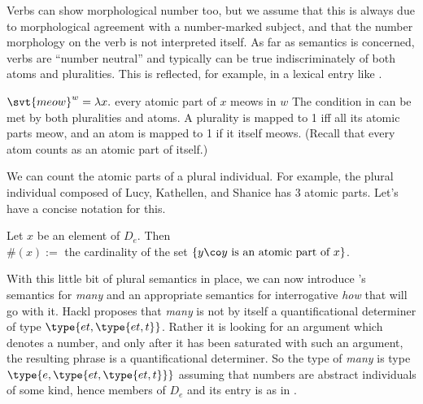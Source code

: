 Verbs can show morphological number too, but we assume that this is always due
to morphological agreement with a number-marked subject, and that the number
morphology on the verb is not interpreted itself. As far as semantics is
concerned, verbs are ``number neutral'' and typically can be true
indiscriminately of both atoms and pluralities. This is reflected, for example,
in a lexical entry like \Next.

\ex $\svt{meow}^{w} = \lambda x.$ every atomic part of $x$ meows in $w$ \xe
%
The condition in \Last can be met by both pluralities and atoms. A plurality is
mapped to 1 iff all its atomic parts meow, and an atom is mapped to 1 if it
itself meows. (Recall that every atom counts as an atomic part of itself.)

We can count the atomic parts of a plural individual. For example, the plural
individual composed of Lucy, Kathellen, and Shanice has 3 atomic parts. Let's
have a concise notation for this.

\ex Let $x$ be an element of $D_{e}$. Then\\
    $\#(x) :=$ the cardinality of the set $\{y\co y\ \text{is an atomic part
      of}\ x\}$.
\xe

%
%
With this little bit of plural semantics in place, we can now introduce
\cite{hackl-2001-thesis}'s semantics for \emph{many} and an appropriate
semantics for interrogative \emph{how} that will go with it. Hackl proposes that
\emph{many} is not by itself a quantificational determiner of type
$\type{et,\type{et,t}}$. Rather it is looking for an argument which denotes a
number, and only after it has been saturated with such an argument, the
resulting phrase is a quantificational determiner. So the type of \emph{many} is
type $\type{e,\type{et,\type{et,t}}}$ \dash assuming that numbers are abstract
individuals of some kind, hence members of $D_{e}$ \dash and its entry is as in
\Next.

